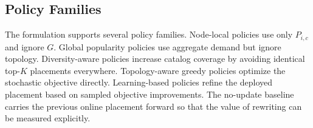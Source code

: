 \subsection{Policy Families}

The formulation supports several policy families. Node-local policies use only \(P_{i,c}\) and ignore \(G\). Global popularity policies use aggregate demand but ignore topology. Diversity-aware policies increase catalog coverage by avoiding identical top-\(K\) placements everywhere. Topology-aware greedy policies optimize the stochastic objective directly. Learning-based policies refine the deployed placement based on sampled objective improvements. The no-update baseline carries the previous online placement forward so that the value of rewriting can be measured explicitly.
